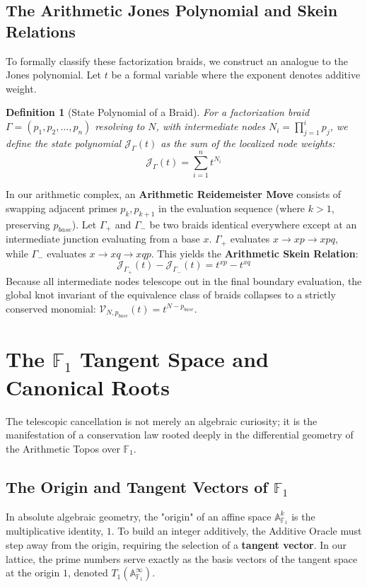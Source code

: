 \documentclass[11pt, a4paper]{article}
\newtheorem{definition}[theorem]{Definition}
\begin{document}
\subsection{The Arithmetic Jones Polynomial and Skein Relations}

To formally classify these factorization braids, we construct an analogue to the Jones polynomial. Let $t$ be a formal variable where the exponent denotes additive weight.

\begin{definition}[State Polynomial of a Braid]
For a factorization braid $\Gamma = (p_1, p_2, \dots, p_n)$ resolving to $N$, with intermediate nodes $N_i = \prod_{j=1}^i p_j$, we define the state polynomial $\mathcal{J}_\Gamma(t)$ as the sum of the localized node weights:
\[
\mathcal{J}_\Gamma(t) = \sum_{i=1}^n t^{N_i}
\]
\end{definition}

In our arithmetic complex, an \textbf{Arithmetic Reidemeister Move} consists of swapping adjacent primes $p_k, p_{k+1}$ in the evaluation sequence (where $k > 1$, preserving $p_{base}$). Let $\Gamma_+$ and $\Gamma_-$ be two braids identical everywhere except at an intermediate junction evaluating from a base $x$. $\Gamma_+$ evaluates $x \to xp \to xpq$, while $\Gamma_-$ evaluates $x \to xq \to xqp$. This yields the \textbf{Arithmetic Skein Relation}:
\[
\mathcal{J}_{\Gamma_+}(t) - \mathcal{J}_{\Gamma_-}(t) = t^{xp} - t^{xq}
\]
Because all intermediate nodes telescope out in the final boundary evaluation, the global knot invariant of the equivalence class of braids collapses to a strictly conserved monomial: $\mathcal{V}_{N, p_{base}}(t) = t^{N - p_{base}}$.

\section{The $\mathbb{F}_1$ Tangent Space and Canonical Roots}

The telescopic cancellation is not merely an algebraic curiosity; it is the manifestation of a conservation law rooted deeply in the differential geometry of the Arithmetic Topos over $\mathbb{F}_1$.

\subsection{The Origin and Tangent Vectors of $\mathbb{F}_1$}

In absolute algebraic geometry, the "origin" of an affine space $\mathbb{A}^k_{\mathbb{F}_1}$ is the multiplicative identity, $1$. To build an integer additively, the Additive Oracle must step away from the origin, requiring the selection of a \textbf{tangent vector}. In our lattice, the prime numbers serve exactly as the basis vectors of the tangent space at the origin $1$, denoted $T_1(\mathbb{A}^\infty_{\mathbb{F}_1})$.
\end{document}
